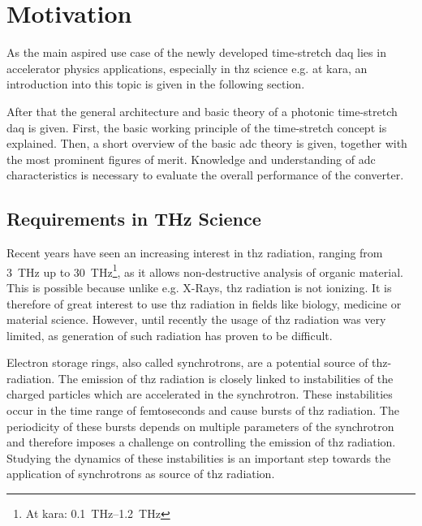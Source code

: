 \glsresetall

\chapter{Motivation}
As the main aspired use case of the newly developed time-stretch \gls{daq} lies in accelerator physics applications, especially in \gls{thz} science e.g. at \gls{kara}, an introduction into this topic is given in the following section. 

After that the general architecture and basic theory of a photonic time-stretch \gls{daq} is given.
First, the basic working principle of the time-stretch concept is explained.
Then, a short overview of the basic \gls{adc} theory is given, together with the most prominent figures of merit. 
Knowledge and understanding of \gls{adc} characteristics is necessary to evaluate the overall performance of the converter. 

\section{Requirements in THz Science}
Recent years have seen an increasing interest in \gls{thz} radiation, ranging from \SI{3}{\tera \hertz} up to \SI{30}{\tera \hertz}\footnote{At \gls{kara}: \SIrange{0.1}{1.2}{\tera \hertz}}, as it allows non-destructive analysis of organic material. 
This is possible because unlike e.g. X-Rays, \gls{thz} radiation is not ionizing.
It is therefore of great interest to use \gls{thz} radiation in fields like biology, medicine or material science.
However, until recently the usage of \gls{thz} radiation was very limited, as generation of such radiation has proven to be difficult.

Electron storage rings, also called synchrotrons, are a potential source of \gls{thz}-radiation. %
The emission of \gls{thz} radiation is closely linked to instabilities of the charged particles which are accelerated in the synchrotron. \cite{mueller2012}
These instabilities occur in the time range of femtoseconds and cause bursts of \gls{thz} radiation.
The periodicity of these bursts depends on multiple parameters of the synchrotron and therefore imposes a challenge on controlling the emission of \gls{thz} radiation.
Studying the dynamics of these instabilities is an important step towards the application of synchrotrons as source of \gls{thz} radiation. \cite{rota2018}




